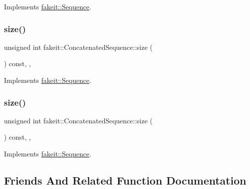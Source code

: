 Implements \mbox{\hyperlink{classfakeit_1_1Sequence_aa9a45b45fc715148832a9dfb7b555556}{fakeit\+::\+Sequence}}.

\mbox{\label{classfakeit_1_1ConcatenatedSequence_aa1dba1b0274b30626ceab3a743c8105a}} 
\subsubsection{\texorpdfstring{size()}{size()}\hspace{0.1cm}{\footnotesize\ttfamily [8/9]}}
{\footnotesize\ttfamily unsigned int fakeit\+::\+Concatenated\+Sequence\+::size (\begin{DoxyParamCaption}{ }\end{DoxyParamCaption}) const\hspace{0.3cm}{\ttfamily [inline]}, {\ttfamily [override]}, {\ttfamily [virtual]}}



Implements \mbox{\hyperlink{classfakeit_1_1Sequence_aa9a45b45fc715148832a9dfb7b555556}{fakeit\+::\+Sequence}}.

\mbox{\label{classfakeit_1_1ConcatenatedSequence_aa1dba1b0274b30626ceab3a743c8105a}} 
\subsubsection{\texorpdfstring{size()}{size()}\hspace{0.1cm}{\footnotesize\ttfamily [9/9]}}
{\footnotesize\ttfamily unsigned int fakeit\+::\+Concatenated\+Sequence\+::size (\begin{DoxyParamCaption}{ }\end{DoxyParamCaption}) const\hspace{0.3cm}{\ttfamily [inline]}, {\ttfamily [override]}, {\ttfamily [virtual]}}



Implements \mbox{\hyperlink{classfakeit_1_1Sequence_aa9a45b45fc715148832a9dfb7b555556}{fakeit\+::\+Sequence}}.



\subsection{Friends And Related Function Documentation}
\mbox{\label{classfakeit_1_1ConcatenatedSequence_adb09b1b1e32428d0c2f46bd549141cdd}} 
